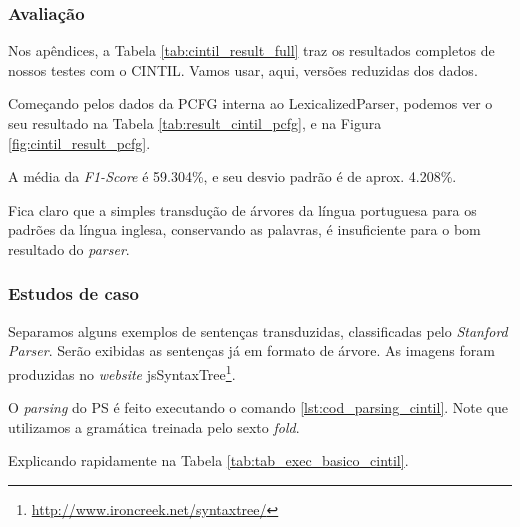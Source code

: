 \subsubsection{Avaliação} 
\label{result_aval_cintil}

Nos apêndices, a Tabela \ref{tab:cintil_result_full} traz os resultados completos de nossos testes com o CINTIL. Vamos usar, aqui, versões reduzidas dos dados.

Começando pelos dados da PCFG interna ao LexicalizedParser, podemos ver o seu resultado na Tabela \ref{tab:result_cintil_pcfg}, e na Figura \ref{fig:cintil_result_pcfg}.
\begin{center}
    
\end{center}

A média da \textit{F1-Score} é 59.304\%, e seu desvio padrão é de aprox. 4.208\%.

Fica claro que a simples transdução de árvores da língua portuguesa para os padrões da língua inglesa, conservando as palavras, é insuficiente para o bom resultado do \textit{parser}.

\begin{center}
    
\end{center}

\subsubsection{Estudos de caso}
\label{subsec:ec_cintil}

Separamos alguns exemplos de sentenças transduzidas, classificadas pelo \textit{Stanford Parser}. Serão exibidas as sentenças já em formato de árvore. As imagens foram produzidas no \textit{website} jsSyntaxTree\footnote{\url{http://www.ironcreek.net/syntaxtree/}}.

O \textit{parsing} do PS é feito executando o comando \ref{lst:cod_parsing_cintil}. Note que utilizamos a gramática treinada pelo sexto \textit{fold}.
\begin{center}
    
\end{center}

Explicando rapidamente na Tabela \ref{tab:tab_exec_basico_cintil}.

\begin{center}
    
\end{center}

